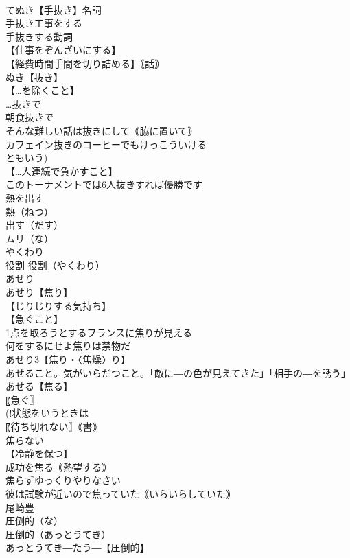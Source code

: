 \documentclass[8pt]{extreport}
\begin{document}
\begin{CJK}{UTF8}{min}
\\	てぬき【手抜き】名詞
\\	手抜き工事をする
\\	手抜きする動詞
\\	【仕事をぞんざいにする】
\\	【経費時間手間を切り詰める】｟話｠
\\	ぬき【抜き】
\\	【…を除くこと】
\\	…抜きで
\\	朝食抜きで
\\	そんな難しい話は抜きにして｟脇に置いて｠
\\	カフェイン抜きのコーヒーでもけっこういける
\\	ともいう)
\\	【…人連続で負かすこと】
\\	このトーナメントでは6人抜きすれば優勝です
\\	熱を出す		
\\	熱（ねつ）
\\	出す（だす）
\\	ムリ（な）		
\\	やくわり
\\	役割		役割（やくわり）
\\	あせり		
\\	あせり【焦り】
\\	【じりじりする気持ち】
\\	【急ぐこと】
\\	1点を取ろうとするフランスに焦りが見える
\\	何をするにせよ焦りは禁物だ
\\	あせり3【焦り・〈焦燥〉り】
\\	あせること。気がいらだつこと。「敵に―の色が見えてきた」「相手の―を誘う」
\\	あせる【焦る】
\\	〖急ぐ〗
\\	(!状態をいうときは 
\\	〖待ち切れない〗｟書｠
\\	焦らない
\\	【冷静を保つ】
\\	成功を焦る｟熱望する｠
\\	焦らずゆっくりやりなさい
\\	彼は試験が近いので焦っていた｟いらいらしていた｠
\\	尾崎豊
\\	圧倒的（な）
\\	圧倒的（あっとうてき）
\\	あっとうてき―たう―【圧倒的】

\end{CJK}
\end{document}
